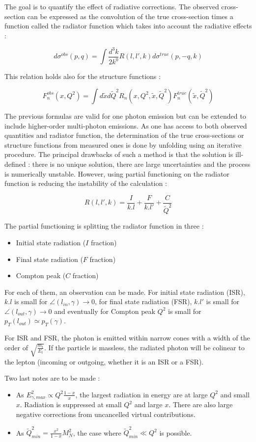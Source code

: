 The goal is to quantify the effect of radiative corrections. The observed cross-section can be expressed as the convolution of the true cross-section times a
function called the radiator function which takes into account the radiative effects :

\[d\sigma^{obs}(p,q) = \int \frac{d^{3}k}{2k^{0}}R(l,l',k)d\sigma^{true}(p,-q,k)\]

This relation holds also for the structure functions :

\[F_{n}^{obs}(x,Q^{2}) = \int d\tilde{x}d\tilde{Q}^{2}R_{n}(x,Q^{2},\tilde{x},\tilde{Q}^{2})F_{n}^{true}(\tilde{x},\tilde{Q}^{2})\]

The previous formulas are valid for one photon emission but can be extended to include higher-order
multi-photon emissions.
As one has access to both observed quantities and radiator function, the determination of the true cross-sections
or structure functions from measured ones is done by unfolding using an iterative procedure.
The principal drawbacks of such a method is that the solution is ill-defined : there is no unique solution,
there are large uncertainties and the process is numerically unstable.
However, using partial functioning on the radiator function is reducing the instability of the calculation :

\[R(l,l',k) = \frac{I}{k.l}+\frac{F}{k.l'}+\frac{C}{\tilde{Q}^{2}}\]

The partial functioning is splitting the radiator function in three :
\begin{itemize}
\item Initial state radiation ($I$ fraction)
\item Final state radiation ($F$ fraction)
\item Compton peak ($C$ fraction)
\end{itemize}

For each of them, an observation can be made. For initial state radiation (ISR), $k.l$ is small for
$\angle (l_{in},\gamma) \rightarrow 0$, for final state radiation (FSR), $k.l'$ is small for
$\angle (l_{out},\gamma) \rightarrow 0$ and eventually for Compton peak $Q^{2}$ is small for
$p_{T}(l_{out}) \simeq p_{T}(\gamma)$.

For ISR and FSR, the photon is emitted within narrow cones with a width of the order of $\sqrt{\frac{m_{t}}{E_{t}}}$.
If the particle is massless, the radiated photon will be colinear to the lepton (incoming or
outgoing, whether it is an ISR or a FSR).

Two last notes are to be made :
\begin{itemize}
\item As $E^{2}_{\gamma,max} \propto Q^{2}\frac{1-x}{x}$, the largest radiation in energy are at large $Q^{2}$ and
small $x$. Radiation is suppressed at small $Q^{2}$ and large $x$. There are also large negative
corrections from uncancelled virtual contributions.
\item As $\tilde{Q}^{2}_{min} = \frac{x^{2}}{1-x}M^{2}_{N}$, the case where $\tilde{Q}^{2}_{min} \ll Q^{2}$
is possible.
\end{itemize}

